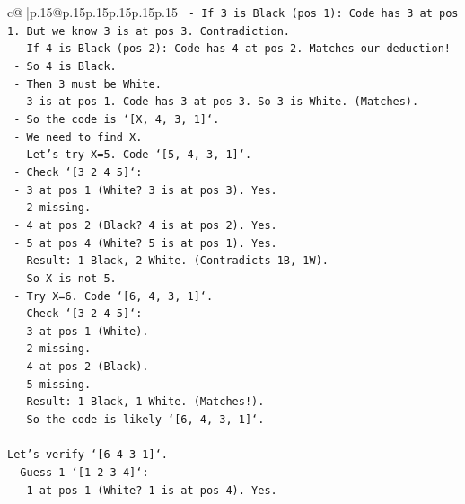 \documentclass{article}
\begin{document}
{\begin{supertabular}{c@{$\;$}|p{.15\linewidth}@{}p{.15\linewidth}p{.15\linewidth}p{.15\linewidth}p{.15\linewidth}p{.15\linewidth}}
{{{\texttt{          {-} If 3 is Black (pos 1): Code has 3 at pos 1. But we know 3 is at pos 3. Contradiction.} \\
\texttt{          {-} If 4 is Black (pos 2): Code has 4 at pos 2. Matches our deduction!} \\
\texttt{          {-} So 4 is Black.} \\
\texttt{          {-} Then 3 must be White.} \\
\texttt{          {-} 3 is at pos 1. Code has 3 at pos 3. So 3 is White. (Matches).} \\
\texttt{          {-} So the code is `{[}X, 4, 3, 1{]}`.} \\
\texttt{          {-} We need to find X.} \\
\texttt{          {-} Let's try X=5. Code `{[}5, 4, 3, 1{]}`.} \\
\texttt{          {-} Check `{[}3 2 4 5{]}`:} \\
\texttt{            {-} 3 at pos 1 (White? 3 is at pos 3). Yes.} \\
\texttt{            {-} 2 missing.} \\
\texttt{            {-} 4 at pos 2 (Black? 4 is at pos 2). Yes.} \\
\texttt{            {-} 5 at pos 4 (White? 5 is at pos 1). Yes.} \\
\texttt{            {-} Result: 1 Black, 2 White. (Contradicts 1B, 1W).} \\
\texttt{          {-} So X is not 5.} \\
\texttt{          {-} Try X=6. Code `{[}6, 4, 3, 1{]}`.} \\
\texttt{          {-} Check `{[}3 2 4 5{]}`:} \\
\texttt{            {-} 3 at pos 1 (White).} \\
\texttt{            {-} 2 missing.} \\
\texttt{            {-} 4 at pos 2 (Black).} \\
\texttt{            {-} 5 missing.} \\
\texttt{            {-} Result: 1 Black, 1 White. (Matches!).} \\
\texttt{          {-} So the code is likely `{[}6, 4, 3, 1{]}`.} \\
\\ 
\texttt{Let's verify `{[}6 4 3 1{]}`.} \\
\texttt{{-} Guess 1 `{[}1 2 3 4{]}`:} \\
\texttt{  {-} 1 at pos 1 (White? 1 is at pos 4). Yes.} \\
}}}
\end{supertabular}}
\end{document}
